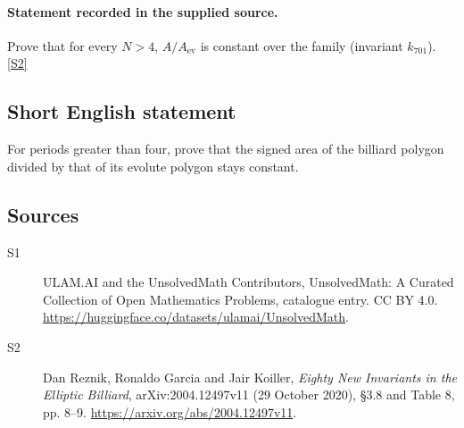 \documentclass[11pt]{article}
\newcommand{\sref}[2]{\hyperlink{source:#1:#2}{[S#2]}}
\begin{document}
\paragraph{Statement recorded in the supplied source.}
Prove that for every $N>4$, $A/A_{\mathrm{ev}}$ is constant over the family (invariant $k_{701}$). \sref{statement}{2}
\subsection{Short English statement}
For periods greater than four, prove that the signed area of the billiard polygon divided by that of its evolute polygon stays constant.
\subsection{Sources}
\begin{description}
\item[\hypertarget{source:statement:1}{S1}] ULAM.AI and the UnsolvedMath Contributors, UnsolvedMath: A Curated Collection of Open Mathematics Problems, catalogue entry. CC BY 4.0. \url{https://huggingface.co/datasets/ulamai/UnsolvedMath}.
\item[\hypertarget{source:statement:2}{S2}] Dan Reznik, Ronaldo Garcia and Jair Koiller, \emph{Eighty New Invariants in the Elliptic Billiard}, arXiv:2004.12497v11 (29 October 2020), \S3.8 and Table 8, pp. 8--9. \url{https://arxiv.org/abs/2004.12497v11}.
\end{description}
\label{end:statement}
\end{document}
